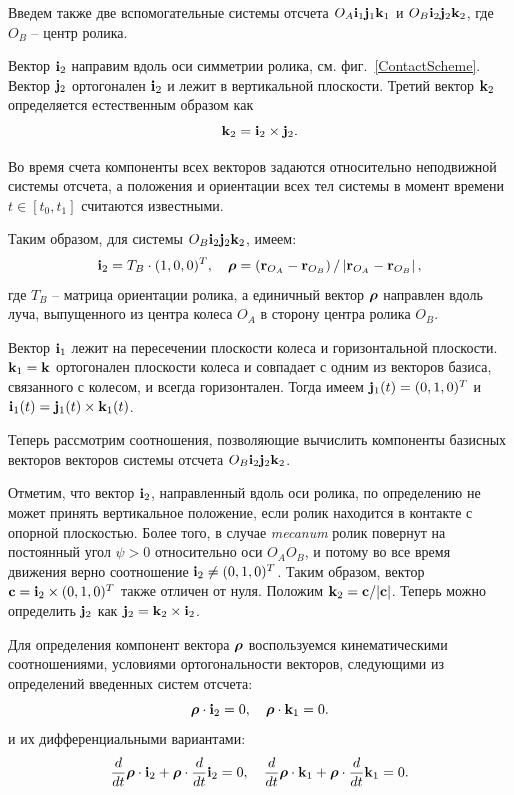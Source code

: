 Введем также две вспомогательные системы отсчета $O_A{\bf i}_1{\bf j}_1{\bf k}_1$ и $O_B{\bf i}_2{\bf j}_2{\bf k}_2$, где $O_B$ -- центр ролика.

Вектор ${\bf i}_2$ направим вдоль оси симметрии ролика, см. фиг.~\ref{ContactScheme}.
Вектор ${\bf j}_2$ ортогонален ${\bf i}_2$ и лежит в вертикальной плоскости.
Третий вектор ${\bf k}_2$ определяется естественным образом как
$$
{\bf k}_2={\bf i}_2\times {\bf j}_2.
$$

Во время счета компоненты всех векторов задаются относительно неподвижной системы отсчета, а положения и ориентации всех тел системы в момент времени $t\in [t_0,t_1]$ считаются известными.

Таким образом, для системы $O_B{\bf i}_2{\bf j}_2{\bf k}_2$, имеем:
$$
{\bf i}_2=T_B\cdot (1,0,0)^T,\quad\boldsymbol{\mathbf{\rho}} =
\left( {\bf r}_{O_A}-{\bf r}_{O_B}\right) /
\left| {\bf r}_{O_A}-{\bf r}_{O_B}\right| ,
$$
где $T_B$ -- матрица ориентации ролика, а единичный вектор $\boldsymbol{\mathbf{\rho}}$ направлен вдоль луча, выпущенного из центра колеса $O_A$ в сторону центра ролика $O_B$.

Вектор ${\bf i}_1$ лежит на пересечении плоскости колеса и горизонтальной плоскости.
${\bf k}_1 = {\bf k}$ ортогонален плоскости колеса и совпадает с одним из векторов базиса, связанного с колесом, и всегда горизонтален.
Тогда имеем ${\bf j}_1(t)=(0,1,0)^T$ и ${\bf i}_1(t)={\bf j}_1(t)\times {\bf k}_1(t)$.

Теперь рассмотрим соотношения, позволяющие вычислить компоненты базисных векторов векторов системы отсчета $O_B{\bf i}_2{\bf j}_2{\bf k}_2$.

Отметим, что вектор ${\bf i}_2$, направленный вдоль оси ролика, по определению не может принять вертикальное положение, если ролик находится в контакте с опорной плоскостью.
Более того, в случае \textit{mecanum} ролик повернут на постоянный угол $\psi > 0$ относительно оси $O_AO_B$, и потому во все время движения верно соотношение ${\bf i}_2\ne (0,1,0)^T$.
Таким образом, вектор ${\bf c}={\bf i}_2\times (0,1,0)^T$ также отличен от нуля.
Положим ${\bf k}_2={\bf c}/|{\bf c}|$. Теперь можно определить ${\bf j}_2$ как
${\bf j}_2={\bf k}_2\times {\bf i}_2$.

Для определения компонент вектора $\boldsymbol{\mathbf{\rho}}$ воспользуемся кинематическими соотношениями, условиями ортогональности векторов, следующими из определений введенных систем отсчета:
$$
\boldsymbol{\mathbf{\rho}}\cdot {\bf i}_2=0,\quad\boldsymbol{\mathbf{\rho}}\cdot {\bf k}_1=0.
$$
и их дифференциальными вариантами:
$$
\dfrac{d}{dt}\boldsymbol{\mathbf{\rho}}\cdot {\bf i}_2+\boldsymbol{\mathbf{\rho}}\cdot\dfrac{d}{dt}{\bf i}_2=0,\quad
\dfrac{d}{dt}\boldsymbol{\mathbf{\rho}}\cdot {\bf k}_1+\boldsymbol{\mathbf{\rho}}\cdot\dfrac{d}{dt}{\bf k}_1=0.
$$

